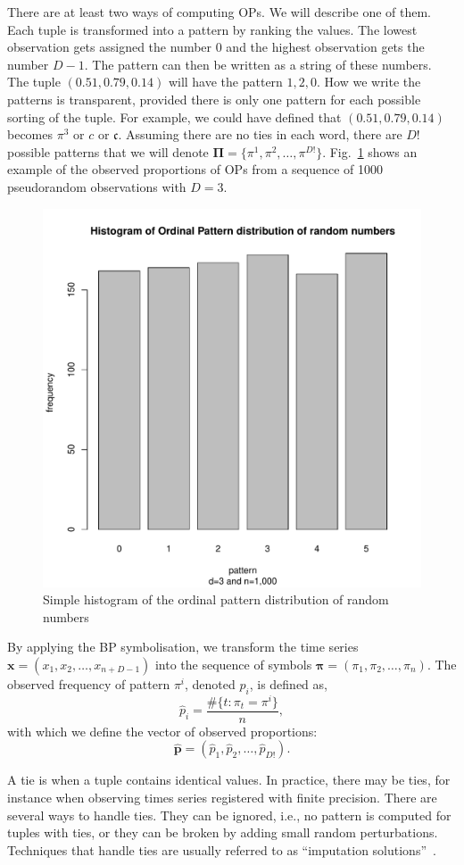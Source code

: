 There are at least two ways of computing OPs.
We will describe one of them.
Each tuple is transformed into a pattern by ranking the values. 
The lowest observation gets assigned the number $0$ and the highest observation gets the number $D-1$. 
The pattern can then be written as a string of these numbers. 
The tuple $(0.51, 0.79, 0.14)$ will have the pattern $1,2,0$.
How we write the patterns is transparent, provided there is only one pattern for each possible sorting of the tuple.
For example, we could have defined that $(0.51, 0.79, 0.14)$ becomes $\pi^3$ or $c$ or $\mathfrak{c}$.
Assuming there are no ties in each word, there are $D!$ possible patterns that we will denote $\bm\Pi=\{\pi^1,\pi^2,\dots,\pi^{D!}\}$.
Fig.~\ref{fig:ExampleProportions} shows an example of the observed proportions of OPs from a sequence of \num{1000} pseudorandom observations with $D=3$.

\begin{figure}[hbt]
	\centering
	\includegraphics[width=.6\textwidth,keepaspectratio]{./powerlaw/histogram.pdf}
	\caption{Simple histogram of the ordinal pattern distribution of random numbers}
	\label{fig:ExampleProportions}
\end{figure}

By applying the BP symbolisation, we transform the time series 
$\bm x = (x_1, x_2, \dots, x_{n+D-1})$ into the sequence of symbols
$\bm \pi = (\pi_1, \pi_2,\dots, \pi_n)$.
The observed frequency of pattern $\pi^i$, denoted $\widehat{p}_i$, is defined as,
$$
\widehat{p}_i=\frac{\#\{t : \pi_t = \pi^i\}}{n} ,
$$
with which we define the vector of observed proportions:
$$
\widehat{\bm p} = (\widehat{p}_1, \widehat{p}_2, \dots, \widehat{p}_{D!}).
$$

A tie is when a tuple contains identical values. In practice, there may be ties, for instance when observing times series registered with finite precision.
There are several ways to handle ties.
They can be ignored, i.e., no pattern is computed for tuples with ties,
or they can be broken by adding small random perturbations. 
Techniques that handle ties are usually referred to as ``imputation solutions''~\cite{PermutationEntropyBasedTimeSeriesAnalysisEqualitiesintheInputSignalCanLeadtoFalseConclusions}.

